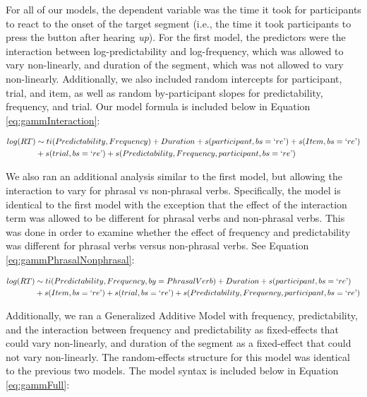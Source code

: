 \documentclass[
  man,floatsintext]{apa6}
\begin{document}
For all of our models, the dependent variable was the time it took for participants to react to the onset of the target segment (i.e., the time it took participants to press the button after hearing \emph{up}). For the first model, the predictors were the interaction between log-predictability and log-frequency, which was allowed to vary non-linearly, and duration of the segment, which was not allowed to vary non-linearly. Additionally, we also included random intercepts for participant, trial, and item, as well as random by-participant slopes for predictability, frequency, and trial. Our model formula is included below in Equation \eqref{eq:gammInteraction}:

\begin{equation}
\begin{aligned}
\label{eq:gammInteraction}
log(RT) & \sim ti(Predictability, Frequency) + Duration + s(participant, bs = `re\text{'}) + s(Item, bs = `re\text{'}) \\
& + s(trial, bs = `re\text{'}) + s(Predictability, Frequency, participant, bs = `re\text{'}) 
\end{aligned}
\end{equation}

We also ran an additional analysis similar to the first model, but allowing the interaction to vary for phrasal vs non-phrasal verbs. Specifically, the model is identical to the first model with the exception that the effect of the interaction term was allowed to be different for phrasal verbs and non-phrasal verbs. This was done in order to examine whether the effect of frequency and predictability was different for phrasal verbs versus non-phrasal verbs. See Equation \eqref{eq:gammPhrasalNonphrasal}:

\begin{equation}
\begin{aligned}
\label{eq:gammPhrasalNonphrasal}
log(RT) & \sim ti(Predictability, Frequency, by = PhrasalVerb) + Duration + s(participant, bs = `re\text{'}) \\ 
& + s(Item, bs = `re\text{'}) + s(trial, bs = `re\text{'}) + s(Predictability, Frequency, participant, bs = `re\text{'}) 
\end{aligned}
\end{equation}

Additionally, we ran a Generalized Additive Model with frequency, predictability, and the interaction between frequency and predictability as fixed-effects that could vary non-linearly, and duration of the segment as a fixed-effect that could not vary non-linearly. The random-effects structure for this model was identical to the previous two models. The model syntax is included below in Equation \eqref{eq:gammFull}:
\end{document}
